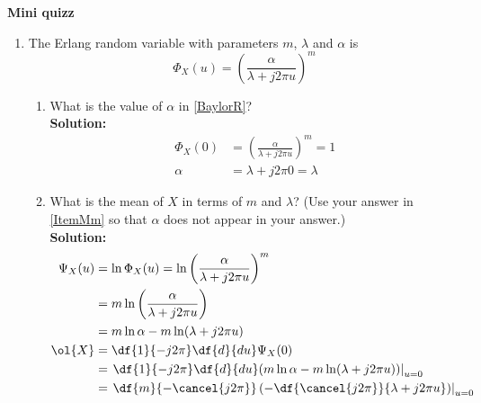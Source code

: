 \textbf{Mini quizz}
\begin{enumerate}[1]


\item
  The Erlang random variable with parameters $m$, $\lambda$ and $\alpha$ is
  \begin{equation}
    \Phi_X (u) = \left( \frac{\alpha }{\lambda + j2\pi u}    \right)^m
    \label{BaylorR}
  \end{equation}
  \begin{enumerate}
  \item What is the value of $\alpha$ in \eqref{BaylorR}?
    \label{ItemMm}\\
    \textbf{Solution:}\\
    \begin{align*}
      \Phi_X (0) & = \left( \frac{\alpha }{\lambda + j2\pi u}    \right)^m = 1 \\
        \alpha   & = \lambda + j2 \pi 0 = \lambda
    \end{align*}
  \item What is the mean of $X$ in terms of $m$ and $\lambda$? (Use your answer in \ref{ItemMm} so that $\alpha$ does not appear in your answer.) \\
    \textbf{Solution:}\\
    \begin{align*}
      \Psi_X(u) & = \ln \Phi_X(u) = \ln \left( \frac{\alpha }{\lambda + j2\pi u}    \right)^m \\
                & = m \ln\left( \frac{\alpha }{\lambda + j2\pi u}    \right) \\
                & = m\ln\alpha - m\ln(\lambda + j2\pi u) \\
      \ol{X} & = \df{1}{-j2\pi}\df{d}{du}\Psi_X(0) \\
             & = \left. \df{1}{-j2\pi}\df{d}{du}(m\ln\alpha - m\ln(\lambda + j2\pi u)) \right|_{u=0} \\
             & = \left. \df{m}{-\cancel{j2\pi}} \left( - \df{\cancel{j2\pi}}{\lambda + j2\pi u} \right) \right|_{u=0} \\

\end{align*}
\end{enumerate}
\end{enumerate}
